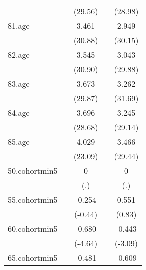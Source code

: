 {\begin{tabular}{l*{4}{c}}
            &                     &     (29.56)         &                     &     (28.98)         \\
[1em]
81.age      &                     &       3.461\sym{***}&                     &       2.949\sym{***}\\
            &                     &     (30.88)         &                     &     (30.15)         \\
[1em]
82.age      &                     &       3.545\sym{***}&                     &       3.043\sym{***}\\
            &                     &     (30.90)         &                     &     (29.88)         \\
[1em]
83.age      &                     &       3.673\sym{***}&                     &       3.262\sym{***}\\
            &                     &     (29.87)         &                     &     (31.69)         \\
[1em]
84.age      &                     &       3.696\sym{***}&                     &       3.245\sym{***}\\
            &                     &     (28.68)         &                     &     (29.14)         \\
[1em]
85.age      &                     &       4.029\sym{***}&                     &       3.466\sym{***}\\
            &                     &     (23.09)         &                     &     (29.44)         \\
[1em]
50.cohortmin5&                     &           0         &                     &           0         \\
            &                     &         (.)         &                     &         (.)         \\
[1em]
55.cohortmin5&                     &      -0.254         &                     &       0.551         \\
            &                     &     (-0.44)         &                     &      (0.83)         \\
[1em]
60.cohortmin5&                     &      -0.680\sym{***}&                     &      -0.443\sym{**} \\
            &                     &     (-4.64)         &                     &     (-3.09)         \\
[1em]
65.cohortmin5&                     &      -0.481\sym{***}&                     &      -0.609\sym{***}\\

\end{tabular}}
